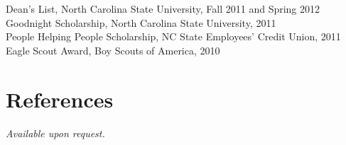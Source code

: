 \documentclass[margin,line,letterpaper]{resume}
\begin{document}
\begin{resume}
    Dean's List, North Carolina State University, Fall 2011 and Spring 2012   \vspace{-8mm}\\%

    Goodnight Scholarship, North Carolina State University, 2011              \vspace{-8mm}\\%

    People Helping People Scholarship, NC State Employees' Credit Union, 2011 \vspace{-8mm}\\%

    Eagle Scout Award, Boy Scouts of America, 2010

    \section{\mysidestyle References} 
    {\sl Available upon request.}




\end{resume}
\end{document}
